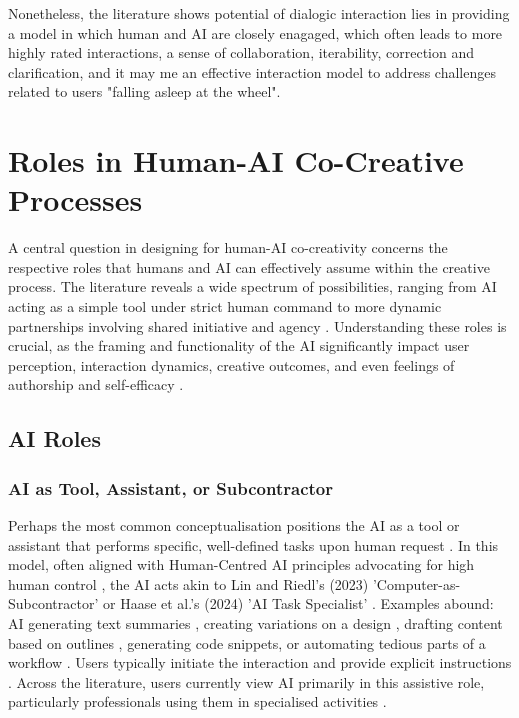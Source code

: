 Nonetheless, the literature shows potential of dialogic interaction lies in providing a model in which human and AI are closely enagaged, which often leads to more highly rated interactions, a sense of collaboration, iterability, correction and clarification, and it may me an effective interaction model to address challenges related to users "falling asleep at the wheel".

\section{Roles in Human-AI Co-Creative Processes}

A central question in designing for human-AI co-creativity concerns the respective roles that humans and AI can effectively assume within the creative process. The literature reveals a wide spectrum of possibilities, ranging from AI acting as a simple tool under strict human command to more dynamic partnerships involving shared initiative and agency \cite{Moruzzi2022-tx, Haase2024-yp, Guzdial2019-gr, Lin2023-jd}. Understanding these roles is crucial, as the framing and functionality of the AI significantly impact user perception, interaction dynamics, creative outcomes, and even feelings of authorship and self-efficacy \cite{Guzdial2019-gr, Lawton2023-tb, McGuire2024-im, Lehmann2022-kr}.

\subsection{AI Roles}

\subsubsection{AI as Tool, Assistant, or Subcontractor}

Perhaps the most common conceptualisation positions the AI as a tool or assistant that performs specific, well-defined tasks upon human request \cite{Lubart2005-zi, Norman1994-kz}. In this model, often aligned with Human-Centred AI principles advocating for high human control \cite{Shneiderman2020-je}, the AI acts akin to Lin and Riedl's (2023) 'Computer-as-Subcontractor' \cite{Lin2023-jd} or Haase et al.'s (2024) 'AI Task Specialist' \cite{Haase2024-yp}. Examples abound: AI generating text summaries \cite{Tholander2023-rv}, creating variations on a design \cite{Kim2021-fh}, drafting content based on outlines \cite{Mirowski2023-oz, Lee2024-vz}, generating code snippets, or automating tedious parts of a workflow \cite{Li2024-yh}. Users typically initiate the interaction and provide explicit instructions \cite{Oh2018-mu}. Across the literature, users currently view AI primarily in this assistive role, particularly professionals using them in specialised activities \cite{Li2024-yh, Yuan2022-kb}. 

